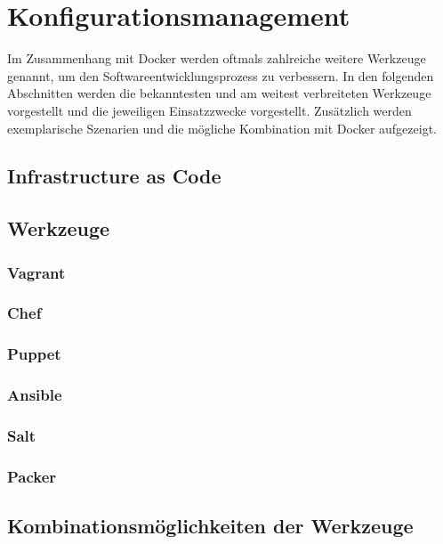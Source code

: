 \chapter{Konfigurationsmanagement}
Im Zusammenhang mit Docker werden oftmals zahlreiche weitere Werkzeuge genannt, um den Softwareentwicklungsprozess zu verbessern. In den folgenden Abschnitten werden die bekanntesten und am weitest verbreiteten Werkzeuge vorgestellt und die jeweiligen Einsatzzwecke vorgestellt. Zusätzlich werden exemplarische Szenarien und die mögliche Kombination mit Docker aufgezeigt.

\section{Infrastructure as Code}

\section{Werkzeuge}

\subsection{Vagrant}
\subsection{Chef}
\subsection{Puppet}
\subsection{Ansible}
\subsection{Salt}
\subsection{Packer}

\section{Kombinationsmöglichkeiten der Werkzeuge}
